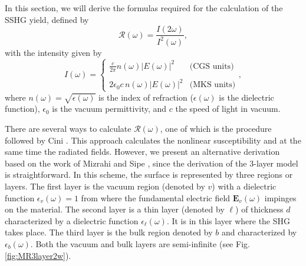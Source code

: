 In this section, we will derive the formulas required for the calculation of the
SSHG yield, defined by
\begin{equation}\label{eq:rintensities}
\mathcal{R}(\omega)=\frac{I(2\omega)}{I^2(\omega)},
\end{equation}
with the intensity given by \cite{boyd, sutherland}
\begin{equation}\label{eq:intensity}
I(\omega)=
\left\{
\begin{array}{cc}
\frac{c}{2\pi}n(\omega)|E(\omega)|^{2} & \text{(CGS units)} \\\\
2\epsilon_{0}c\, n(\omega)|E(\omega)|^{2} & \text{(MKS units)}
\end{array}
\right.,
\end{equation}
where $n(\omega)=\sqrt{\epsilon(\omega)}$ is the index of refraction ($\epsilon(\omega)$ is the dielectric function), $\epsilon_{0}$ is the vacuum
permittivity, and $c$ the speed of light in vacuum.

There are several ways to calculate $\mathcal{R}(\omega)$, one of which is the
procedure followed by Cini \cite{ciniPRB91}. This approach calculates the
nonlinear susceptibility and at the same time the radiated fields. However, we
present an alternative derivation based on the work of Mizrahi and Sipe
\cite{mizrahiJOSA88}, since the derivation of the 3-layer model is
straightforward. In this scheme, the surface is represented by three regions or
layers. The first layer is the vacuum region (denoted by $v$) with a dielectric
function $\epsilon_{v}(\omega)=1$ from where the fundamental electric field
$\mathbf{E}_{v}(\omega)$ impinges on the material. The second layer is a thin
layer (denoted by $\ell$) of thickness $d$ characterized by a dielectric
function $\epsilon_{\ell}(\omega)$. It is in this layer where the SHG takes
place. The third layer is the bulk region denoted by $b$ and characterized by
$\epsilon_{b}(\omega)$. Both the vacuum and bulk layers are semi-infinite (see
Fig. \ref{fig:MR3layer2w}).

